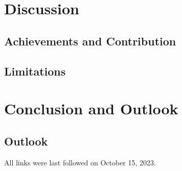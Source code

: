 \documentclass[
  a4paper,  %
  twoside,  %
  bibliography=totoc,
  headsepline,
  cleardoublepage=empty,
  parskip=half,
  draft=false
]{scrbook}
\begin{document}
\chapter{Discussion}
\label{chap:discussion}
\section{Achievements and Contribution}
\label{sec:achievementsAndContribution}
\section{Limitations}
\label{sec:limitations}


\chapter{Conclusion and Outlook}
\label{chap:zusfas}

\section{Outlook}

\printbibliography

All links were last followed on October 15, 2023.

\appendix

\pagestyle{empty}
\renewcommand*{\chapterpagestyle}{empty}
\Versicherung
\end{document}
